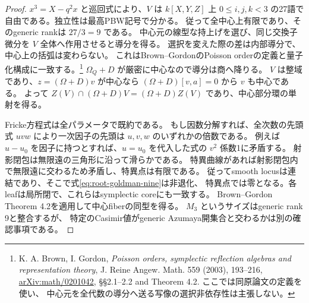 \begin{proof}
$x^3=X-q^2x$ と巡回式により、$V$ は $k[X,Y,Z]$ 上
$0\le i,j,k<3$ の27語で自由である。独立性は最高PBW記号で分かる。
従って全中心上有限であり、そのgeneric rankは $27/3=9$ である。
中心元の線型な持上げを選び、同じ交換子微分を $V$ 全体へ作用させると導分を得る。
選択を変えた際の差は内部導分で、中心上の括弧は変わらない。
これはBrown--GordonのPoisson orderの定義と量子化構成に一致する。\footnote{
K. A. Brown, I. Gordon, \emph{Poisson orders, symplectic reflection algebras and
representation theory}, J. Reine Angew. Math. 559 (2003), 193--216,
\href{https://arxiv.org/abs/math/0201042}{arXiv:math/0201042},
\S\S2.1--2.2 and Theorem 4.2. ここでは同原論文の定義を使い、
中心元を全代数の導分へ送る写像の選択非依存性は主張しない。}
$\Omega_Q+D$ が厳密に中心なので導分は商へ降りる。
$V$ は整域であり、$z=(\Omega+D)v$ が中心なら
$(\Omega+D)[v,a]=0$ から $v$ も中心である。
よって $Z(V)\cap(\Omega+D)V=(\Omega+D)Z(V)$ であり、中心部分環の単射を得る。

Fricke方程式は全パラメータで既約である。
もし因数分解すれば、全次数の先頭式 $uvw$ により一次因子の先頭は
$u,v,w$ のいずれかの倍数である。
例えば $u-u_0$ を因子に持つとすれば、$u=u_0$ を代入した式の $v^2$ 係数1に矛盾する。
射影閉包は無限遠の三角形に沿って滑らかである。
特異曲線があれば射影閉包内で無限遠に交わるため矛盾し、特異点は有限である。
従ってsmooth locusは連結であり、そこで式\eqref{eq:root-goldman-nine}は非退化、
特異点では零となる。各leafは局所閉で、これらはsymplectic coreにも一致する。
Brown--Gordon Theorem 4.2を適用して中心fiberの同型を得る。
$M_3$ というサイズはgeneric rank 9と整合するが、
特定のCasimir値がgeneric Azumaya開集合と交わるかは別の確認事項である。
\end{proof}

